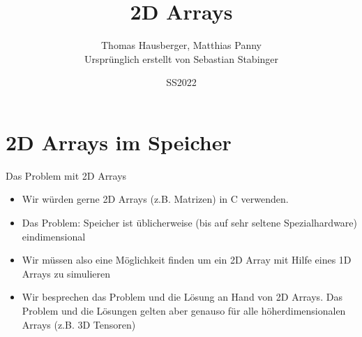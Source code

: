 \documentclass[presentation]{beamer}
\author{Thomas Hausberger, Matthias Panny \\ Ursprünglich erstellt von Sebastian Stabinger}
\date{SS2022}
\title{2D Arrays}
\begin{document}
\maketitle

\section{2D Arrays im Speicher}
\label{sec:org6cdfd32}
\begin{frame}[label={sec:org95547e4}]{Das Problem mit 2D Arrays}
\begin{itemize}
\item Wir würden gerne 2D Arrays (z.B. Matrizen) in C verwenden.
\item Das Problem: \alert{Speicher ist} üblicherweise (bis auf sehr seltene
Spezialhardware) \alert{eindimensional}
\item Wir müssen also eine Möglichkeit finden um ein \alert{2D Array mit Hilfe
eines 1D Arrays zu simulieren}
\item Wir besprechen das Problem und die Lösung an Hand von 2D Arrays. Das
Problem und die Lösungen \alert{gelten aber genauso für alle
höherdimensionalen} Arrays (z.B. 3D Tensoren)
\end{itemize}
\end{frame}
\end{document}
